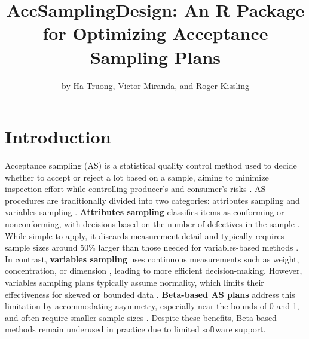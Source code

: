 \title{AccSamplingDesign: An R Package for Optimizing Acceptance Sampling Plans}


\author{by Ha Truong, Victor Miranda, and Roger Kissling}

\maketitle


\section{Introduction}\label{sec-introduction}

Acceptance sampling (AS) is a statistical quality control method used to decide
whether to accept or reject a lot based on a sample, aiming to minimize inspection
effort while controlling producer's and consumer's risks \citep{juran1988quality}.
AS procedures are traditionally divided into two categories: attributes sampling
and variables sampling \citep{schilling2012acceptance}.
\textbf{Attributes sampling} classifies items as conforming or nonconforming,
with decisions based on the number of defectives in the sample \citep{iso2859}.
While simple to apply, it discards measurement detail and typically requires
sample sizes around 50\% larger than those needed for variables-based methods
\citep{mittag1997measurement}. In contrast, \textbf{variables sampling} uses
continuous measurements such as weight, concentration, or dimension
\citep{iso3951}, leading to more efficient decision-making.
However, variables sampling plans typically assume normality, which limits their
effectiveness for skewed or bounded data \citep{brown1985acceptance}.
\textbf{Beta-based AS plans} address this limitation by accommodating asymmetry,
especially near the bounds of 0 and 1, and often require smaller sample sizes
\citep{govindaraju2015sampling}. Despite these benefits, Beta-based methods
remain underused in practice due to limited software support.

